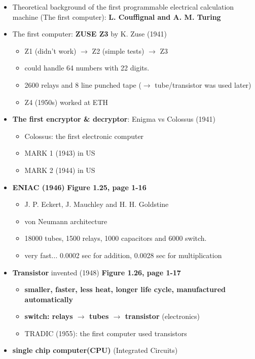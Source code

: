 \documentclass{standalone}
\begin{document}
\begin{itemize}
	\item Theoretical background of the first programmable electrical calculation machine (The first computer): \textbf{L. Couffignal and A. M. Turing}
	\item The first computer: \textbf{ZUSE Z3} by K. Zuse (1941)
		\begin{itemize}
			\item Z1 (didn't work) $\rightarrow$ Z2 (simple tests) $\rightarrow$ Z3 
			\item could handle 64 numbers with 22 digits. 
			\item 2600 relays and 8 line punched tape ($\rightarrow$ tube/transistor was used later)
			\item Z4 (1950s) worked at ETH 
		\end{itemize}	
	\item \textbf{The first encryptor \& decryptor}: Enigma vs Colossus (1941)
		\begin{itemize}
			\item Colossus: the first electronic computer
			\item MARK 1 (1943) in US
			\item MARK 2 (1944) in US
		\end{itemize} 
	\item \textbf{ENIAC (1946)} \textbf{Figure 1.25, page 1-16}
		\begin{itemize}
			\item J. P. Eckert, J. Mauchley and H. H. Goldstine
			\item von Neumann architecture
			\item 18000 tubes, 1500 relays, 1000 capacitors and 6000 switch.
			\item very fast... 0.0002 sec for addition, 0.0028 sec for multiplication 
		\end{itemize}
	\item \textbf{Transistor} invented (1948) \textbf{Figure 1.26, page 1-17}
		\begin{itemize}
			\item \textbf{smaller, faster, less heat, longer life cycle, manufactured automatically}
			\item \textbf{switch: relays $\rightarrow$ tubes $\rightarrow$ transistor} (electronics)
			\item TRADIC (1955): the first computer used transistors
		\end{itemize}   
	\item \textbf{single chip computer(CPU)} (Integrated Circuits) 

\end{itemize}
\end{document}
